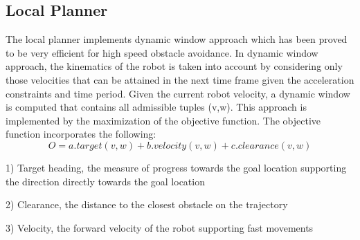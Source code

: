 \documentclass[journal,twoside]{IEEEtran}
\begin{document}
\subsection{Local Planner}
\noindent The local planner implements dynamic window approach which has been proved to be very efficient for high speed obstacle avoidance. In dynamic window approach, the kinematics of the robot is taken into account by considering only those velocities that can be attained in the next time frame given the acceleration constraints and time period. Given the current robot velocity, a dynamic window is computed that contains all admissible tuples (v,w). This approach is implemented by the maximization of the objective function. The objective function incorporates the following:
\begin{equation}
O = a.target(v, w) + b.velocity(v, w) + c.clearance(v, w)
\end{equation}
\par 1) Target heading, the measure of progress towards the goal location supporting the direction directly towards the goal location 
\par 2) Clearance, the distance to the closest obstacle on the trajectory
\par 3) Velocity, the forward velocity of the robot supporting fast movements
\end{document}
